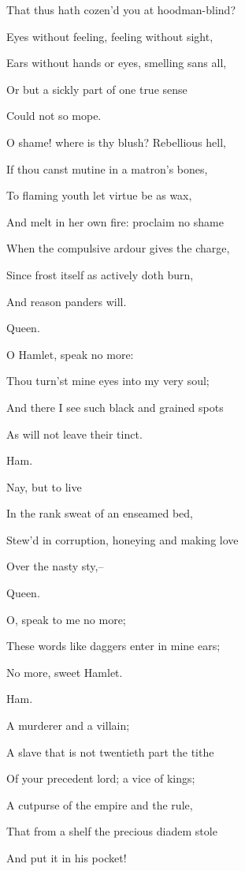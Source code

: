 \documentclass[12pt]{book}
\begin{document}
That thus hath cozen'd you at hoodman-blind?

Eyes without feeling, feeling without sight,

Ears without hands or eyes, smelling sans all,

Or but a sickly part of one true sense

Could not so mope.

O shame! where is thy blush? Rebellious hell,

If thou canst mutine in a matron's bones,

To flaming youth let virtue be as wax,

And melt in her own fire: proclaim no shame

When the compulsive ardour gives the charge,

Since frost itself as actively doth burn,

And reason panders will.



Queen.

O Hamlet, speak no more:

Thou turn'st mine eyes into my very soul;

And there I see such black and grained spots

As will not leave their tinct.



Ham.

Nay, but to live

In the rank sweat of an enseamed bed,

Stew'd in corruption, honeying and making love

Over the nasty sty,--



Queen.

O, speak to me no more;

These words like daggers enter in mine ears;

No more, sweet Hamlet.



Ham.

A murderer and a villain;

A slave that is not twentieth part the tithe

Of your precedent lord; a vice of kings;

A cutpurse of the empire and the rule,

That from a shelf the precious diadem stole

And put it in his pocket!
\end{document}

